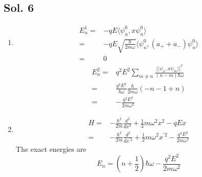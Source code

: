 \subsection*{Sol. 6}
\begin{enumerate}
    \item \begin{align*}
        E_n^1 =& -qE\langle\psi_n^0, x\psi_n^0\rangle\\
        =&-qE\sqrt{\frac{\hbar}{2m\omega}}
        \langle\psi^0_n, (a_+ + a_-)\psi_n^0\rangle\\
        =&0
    \end{align*}
    \begin{align*}
        E_n^2 =& q^2E^2\sum_{m\neq n}
        \frac{|\langle \psi_n, x\psi_m\rangle|^2}{(n-m)\hbar\omega}\\
        =&\frac{q^2E^2}{\hbar\omega}
        \frac{\hbar}{2m\omega}
        (-n-1 + n)\\
        =&-\frac{q^2E^2}{2m\omega^2}
    \end{align*}
    \item 
    \begin{align*}
        H =& -\frac{\hbar^2}{2m}\frac{d^2}{dx^2}+\frac{1}{2}m\omega^2x^2-qEx\\
        =&-\frac{\hbar^2}{2m}\frac{d^2}{dx^{'2}} +
        \frac{1}{2}m\omega^2x^{'2} - \frac{q^2E^2}{2m\omega^2}
    \end{align*}
    The exact energies are 
    $$
    E_n = (n+\frac{1}{2})\hbar\omega-\frac{q^2E^2}{2m\omega^2}
    $$
\end{enumerate}

